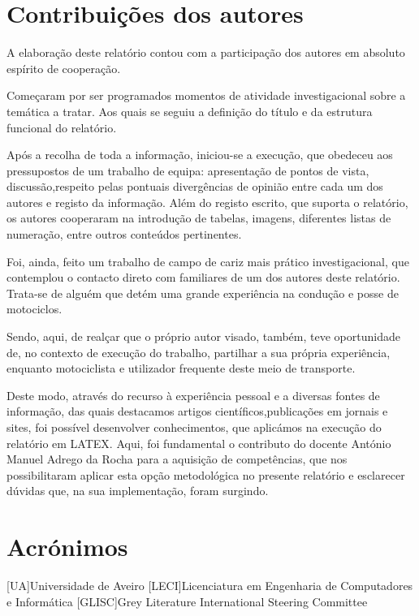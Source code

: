\documentclass{report}
\begin{document}
\label{chap.conclusao}
\chapter*{Contribuições dos autores}
A elaboração deste relatório contou com a participação dos autores em absoluto espírito de cooperação.

Começaram por ser programados momentos de atividade investigacional sobre a temática a tratar. Aos quais se seguiu a definição do título e da estrutura funcional do relatório.

Após a recolha de toda a informação, iniciou-se a execução, que obedeceu aos pressupostos de um trabalho de equipa: apresentação de pontos de vista, discussão,respeito pelas pontuais divergências de opinião entre cada um dos autores e registo da informação. Além do registo escrito, que suporta o relatório, os autores cooperaram na introdução de tabelas, imagens, diferentes listas de numeração, entre outros conteúdos pertinentes.

Foi, ainda, feito um trabalho de campo de cariz mais prático investigacional, que contemplou o contacto direto com familiares de um dos autores deste relatório. Trata-se de alguém que detém uma grande experiência na condução e posse de motociclos.

Sendo, aqui, de realçar que o próprio autor visado, também, teve oportunidade de, no contexto de execução do trabalho, partilhar a sua própria experiência, enquanto motociclista e utilizador frequente deste meio de transporte.

Deste modo, através do recurso à experiência pessoal e a diversas fontes de informação, das quais destacamos artigos científicos,publicações em jornais e sites, foi possível desenvolver conhecimentos, que aplicámos na execução do relatório em LATEX. Aqui, foi fundamental o contributo do docente António Manuel Adrego da Rocha para a aquisição de competências, que nos possibilitaram aplicar esta opção metodológica no presente relatório e esclarecer dúvidas que, na sua implementação, foram surgindo.
\chapter{Acrónimos}
\begin{acronym}
[UA]{Universidade de Aveiro}
[LECI]{Licenciatura em Engenharia de Computadores e Informática}
[GLISC]{Grey Literature International Steering Committee}
\end{acronym}
\end{document}
